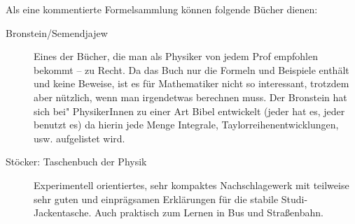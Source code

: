 Als eine kommentierte Formelsammlung können folgende Bücher dienen:

\begin{description}

\item[Bronstein/Semendjajew]{
Eines der Bücher, die man als Physiker von jedem Prof empfohlen
bekommt -- zu
Recht. Da das Buch nur die Formeln und Beispiele enthält und keine
Beweise,
ist es für Mathematiker nicht so interessant, trotzdem aber nützlich,
wenn
man irgendetwas berechnen muss. Der Bronstein hat sich bei"
PhysikerInnen
zu einer Art Bibel entwickelt (jeder hat es, jeder benutzt es) da
hierin jede Menge Integrale,
Taylorreihenentwicklungen, usw. aufgelistet wird.}

\item[Stöcker: Taschenbuch der Physik]{
Experimentell orientiertes, sehr kompaktes Nachschlagewerk mit
teilweise sehr
guten und einprägsamen Erklärungen für die stabile Studi-
Jackentasche.
Auch praktisch zum Lernen in Bus und Straßenbahn.}
\end{description}
